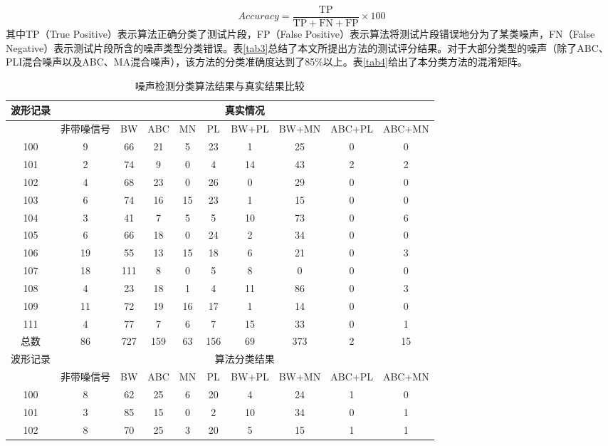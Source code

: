 \begin{equation}
  Accuracy=\frac{\mathrm{TP}}{\mathrm{TP+FN+FP}} \times 100
  \label{equ11}
\end{equation}
其中TP（True Positive）表示算法正确分类了测试片段，FP（False Positive）表示算法将测试片段错误地分为了某类噪声，FN（False Negative）表示测试片段所含的噪声类型分类错误。表\ref{tab3}总结了本文所提出方法的测试评分结果。对于大部分类型的噪声（除了ABC、PLI混合噪声以及ABC、MA混合噪声），该方法的分类准确度达到了85\%以上。表\ref{tab4}给出了本分类方法的混淆矩阵。
\begin{table}[htbp]
\scriptsize
  \centering
  \caption{噪声检测分类算法结果与真实结果比较 %
  \label{tab2}}
\begin{tabular}{|c|c|c|c|c|c|c|c|c|c|}
\hline 
波形记录 & \multicolumn{9}{c|}{真实情况} \\ 
\hline 
~~ & 非带噪信号 & BW & ABC & MN & PL & BW+PL & BW+MN & ABC+PL & ABC+MN \\ 
\hline 
100 & 9 & 66 & 21 & 5 & 23 & 1 & 25 & 0 & 0 \\ 
\hline 
101 & 2 & 74 & 9 & 0 & 4 & 14 & 43 & 2 & 2 \\ 
\hline 
102 & 4 & 68 & 23 & 0 & 26 & 0 & 29 & 0 & 0 \\ 
\hline 
103 & 6 & 74 & 16 & 15 & 23 & 1 & 15 & 0 & 0 \\ 
\hline 
104 & 3 & 41 & 7 & 5 & 5 & 10 & 73 & 0 & 6 \\ 
\hline 
105 & 6 & 66 & 18 & 0 & 24 & 2 & 34 & 0 & 0 \\ 
\hline 
106 & 19 & 55 & 13 & 15 & 18 & 6 & 21 & 0 & 3 \\ 
\hline 
107 & 18 & 111 & 8 & 0 & 5 & 8 & 0 & 0 & 0 \\ 
\hline 
108 & 4 & 23 & 18 & 1 & 4 & 11 & 86 & 0 & 3 \\ 
\hline 
109 & 11 & 72 & 19 & 16 & 17 & 1 & 14 & 0 & 0 \\ 
\hline 
111 & 4 & 77 & 7 & 6 & 7 & 15 & 33 & 0 & 1 \\ 
\hline 
总数 & 86 & 727 & 159 & 63 & 156 & 69 & 373 & 2 & 15 \\ 
\hline 
波形记录 & \multicolumn{9}{c|}{算法分类结果} \\ 
\hline 
~~ & 非带噪信号 & BW & ABC & MN & PL & BW+PL & BW+MN & ABC+PL & ABC+MN \\ 
\hline 
100 & 8 & 62 & 25 & 6 & 20 & 4 & 24 & 1 & 0 \\ 
\hline 
101 & 3 & 85 & 15 & 0 & 2 & 10 & 34 & 0 & 1 \\ 
\hline 
102 & 8 & 70 & 25 & 3 & 20 & 5 & 15 & 1 & 1 \\ 

\end{tabular}
\end{table}
